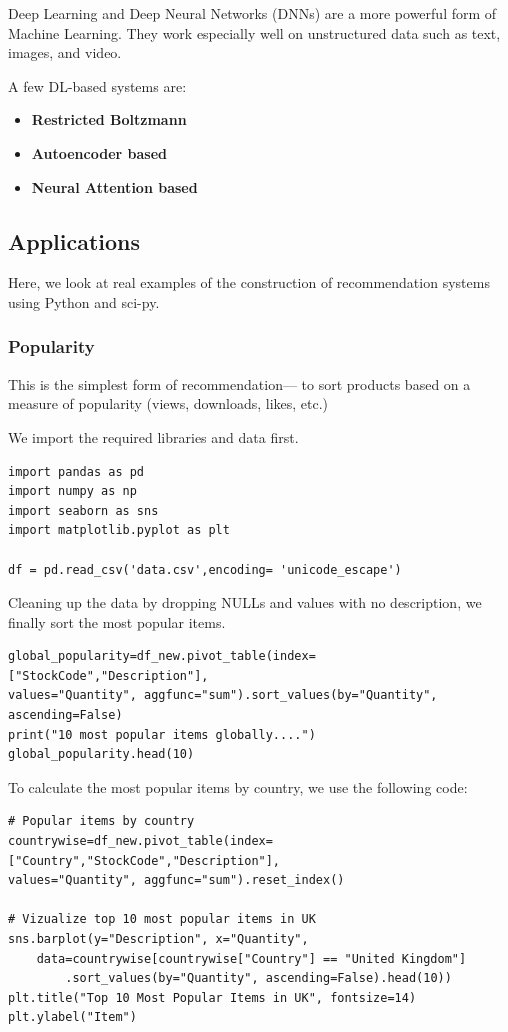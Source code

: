 \documentclass{article}
\begin{document}
Deep Learning and Deep Neural Networks (DNNs) are a more powerful form of Machine Learning. They work especially well on unstructured data such as text, images, and video.

A few DL-based systems are:

\begin{itemize}
    \item{\textbf{Restricted Boltzmann}}
    \item{\textbf{Autoencoder based}}
    \item{\textbf{Neural Attention based}}
\end{itemize}

\subsection{Applications}

Here, we look at real examples of the construction of recommendation systems using Python and sci-py.

\subsubsection{Popularity}

This is the simplest form of recommendation— to sort products based on a measure of popularity (views, downloads, likes, etc.)

\medskip

We import the required libraries and data first.

\begin{lstlisting}
import pandas as pd
import numpy as np
import seaborn as sns
import matplotlib.pyplot as plt

df = pd.read_csv('data.csv',encoding= 'unicode_escape')
\end{lstlisting}

Cleaning up the data by dropping NULLs and values with no description, we finally sort the most popular items.

\begin{lstlisting}
global_popularity=df_new.pivot_table(index=["StockCode","Description"],
values="Quantity", aggfunc="sum").sort_values(by="Quantity", ascending=False)
print("10 most popular items globally....")
global_popularity.head(10)
\end{lstlisting}

To calculate the most popular items by country, we use the following code:

\begin{lstlisting}
# Popular items by country
countrywise=df_new.pivot_table(index=["Country","StockCode","Description"],
values="Quantity", aggfunc="sum").reset_index()

# Vizualize top 10 most popular items in UK
sns.barplot(y="Description", x="Quantity",
    data=countrywise[countrywise["Country"] == "United Kingdom"]
        .sort_values(by="Quantity", ascending=False).head(10))
plt.title("Top 10 Most Popular Items in UK", fontsize=14)
plt.ylabel("Item")
\end{lstlisting}
\end{document}
